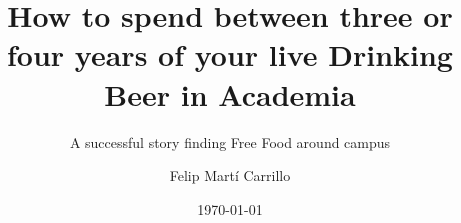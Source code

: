 \documentclass{class/fsetswin-phd}
\author{
	Felip Mart\'{i} Carrillo 
}
\title{How to spend between three or four years of your live Drinking Beer in Academia}
\subtitle{A successful story finding Free Food around campus}
\date{\mydate\today}
\begin{document}
    \makefrontmatter


    \cleardoublepage


    

    

    




    
    \begin{appendices}

        

        


    \end{appendices}
\end{document}
